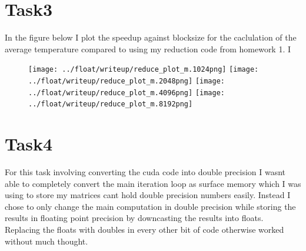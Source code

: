 \documentclass[a4paper]{article}
\begin{document}
\section{Task3}

	In the figure below I plot the speedup against blocksize for the
	caclulation of the average temperature  compared to using my reduction
	code from homework 1. I

	\begin{figure}[h!]
		\centering
		\texttt{[image: ../float/writeup/reduce\_plot\_m.1024png]}
		\texttt{[image: ../float/writeup/reduce\_plot\_m.2048png]}
		\texttt{[image: ../float/writeup/reduce\_plot\_m.4096png]}
		\texttt{[image: ../float/writeup/reduce\_plot\_m.8192png]}
	\end{figure}

\section{Task4}
	
	For this task involving converting the cuda code into double precision I wasnt able
	to completely convert the main iteration loop as surface memory which I was using 
	to store my matrices cant hold double precision numbers easily. Instead I chose to 
	only change the main computation in double precision while storing the results in 
	floating point precision by downcasting the results into floats. Replacing the floats
	with doubles in every other bit of code otherwise worked without much thought.





\end{document}
